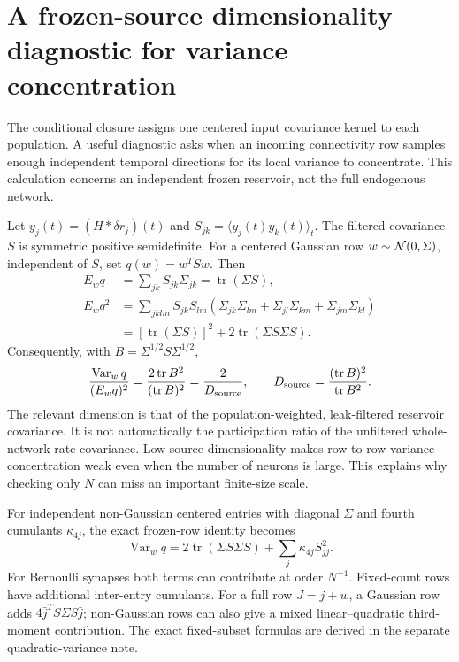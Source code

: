 \section{A frozen-source dimensionality diagnostic for variance concentration}
\label{sec:source-concentration-diagnostic}

The conditional closure assigns one centered input covariance kernel to each
population. A useful diagnostic asks when an incoming connectivity row samples
enough independent temporal directions for its local variance to concentrate.
This calculation concerns an independent frozen reservoir, not the full
endogenous network.

Let $y_j(t)=(H*\delta r_j)(t)$ and
$S_{jk}=\langle y_j(t)y_k(t)\rangle_t$. The filtered covariance $S$ is symmetric
positive semidefinite. For a centered Gaussian row $w\sim{\cal N}(0,\Sigma)$,
independent of $S$, set $q(w)=w^T S w$. Then
\begin{align}
 E_w q&=\sum_{jk}S_{jk}\Sigma_{jk}=\operatorname{tr}(\Sigma S),\\
 E_w q^2&=\sum_{jklm}S_{jk}S_{lm}
 (\Sigma_{jk}\Sigma_{lm}+\Sigma_{jl}\Sigma_{km}
  +\Sigma_{jm}\Sigma_{kl})\\
 &=[\operatorname{tr}(\Sigma S)]^2+2\operatorname{tr}(\Sigma S\Sigma S).
\end{align}
Consequently, with $B=\Sigma^{1/2}S\Sigma^{1/2}$,
\begin{equation}
 \frac{\operatorname{Var}_w q}{(E_w q)^2}
 =\frac{2\operatorname{tr}B^2}{(\operatorname{tr}B)^2}
 =\frac{2}{D_{\rm source}},\qquad
 D_{\rm source}=\frac{(\operatorname{tr}B)^2}{\operatorname{tr}B^2}.
\end{equation}
The relevant dimension is that of the population-weighted, leak-filtered
reservoir covariance. It is not automatically the participation ratio of the
unfiltered whole-network rate covariance. Low source dimensionality makes
row-to-row variance concentration weak even when the number of neurons is
large. This explains why checking only $N$ can miss an important finite-size
scale.

For independent non-Gaussian centered entries with diagonal $\Sigma$ and
fourth cumulants $\kappa_{4j}$, the exact frozen-row identity becomes
\begin{equation}
 \operatorname{Var}_w q
 =2\operatorname{tr}(\Sigma S\Sigma S)
  +\sum_j\kappa_{4j}S_{jj}^2.
\end{equation}
For Bernoulli synapses both terms can contribute at order $N^{-1}$.
Fixed-count rows have additional inter-entry cumulants. For a full row
$J=\bar j+w$, a Gaussian row adds
$4\bar j^T S\Sigma S\bar j$; non-Gaussian rows can also give a mixed
linear--quadratic third-moment contribution. The exact fixed-subset formulas
are derived in the separate quadratic-variance note.

